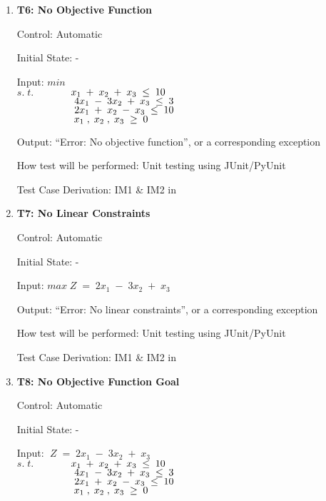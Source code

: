 \documentclass[12pt, titlepage]{article}
\begin{document}
\begin{enumerate}
	\item{\textbf{T6: No Objective Function}}
	
	Control: Automatic
	
	Initial State: -
	
	Input: $min $\\
	$s.\;t.$$\hspace*{1.3cm} x_1\;+\;x_2\;+\;x_3\; \leq \;10$\\
	$\hspace*{2cm} 4x_1\;-\;3x_2\;+\;x_3\; \leq \;3$\\
	$\hspace*{2cm} 2x_1\;+\;x_2\;-\;x_3\; \leq \;10$\\
	$\hspace*{2cm} x_1\;,\;x_2\;,\;x_3\; \geq \;0$
	
	Output: ``Error: No objective function'', or a corresponding exception
	
	How test will be performed: Unit testing using JUnit/PyUnit
	
	Test Case Derivation: IM1 \& IM2 in \cite{losms-ca}
	
	\item{\textbf{T7: No Linear Constraints}}
	
	Control: Automatic
	
	Initial State: -
	
	Input: $max\;Z\;=\;2x_1\;-\;3x_2\;+\;x_3$
	
	Output: ``Error: No linear constraints'', or a corresponding exception
	
	How test will be performed: Unit testing using JUnit/PyUnit
	
	Test Case Derivation: IM1 \& IM2 in \cite{losms-ca}
	
	\item{\textbf{T8: No Objective Function Goal}}
	
	Control: Automatic
	
	Initial State: -
	
	Input: $\;Z\;=\;2x_1\;-\;3x_2\;+\;x_3$\\
	$s.\;t.$$\hspace*{1.3cm} x_1\;+\;x_2\;+\;x_3\; \leq \;10$\\
	$\hspace*{2cm} 4x_1\;-\;3x_2\;+\;x_3\; \leq \;3$\\
	$\hspace*{2cm} 2x_1\;+\;x_2\;-\;x_3\; \leq \;10$\\
	$\hspace*{2cm} x_1\;,\;x_2\;,\;x_3\; \geq \;0$
	

\end{enumerate}
\end{document}

